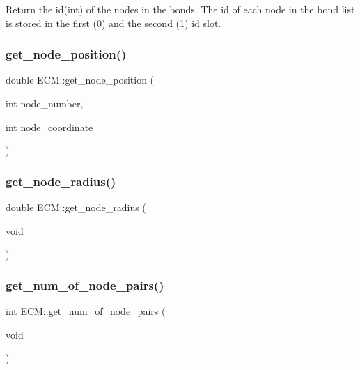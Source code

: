 Return the id(int) of the nodes in the bonds. The id of each node in the bond list is stored in the first (0) and the second (1) id slot. \mbox{\label{classECM_a7c17fccf4d4f8165a7dceee20c81433d}} 
\subsubsection{\texorpdfstring{get\_node\_position()}{get\_node\_position()}}
{\footnotesize\ttfamily double E\+C\+M\+::get\+\_\+node\+\_\+position (\begin{DoxyParamCaption}\item[{int}]{node\+\_\+number,  }\item[{int}]{node\+\_\+coordinate }\end{DoxyParamCaption})\hspace{0.3cm}{\ttfamily [inline]}}

\mbox{\label{classECM_a59c396242e1f2a7992bcb3744c27d280}} 
\subsubsection{\texorpdfstring{get\_node\_radius()}{get\_node\_radius()}}
{\footnotesize\ttfamily double E\+C\+M\+::get\+\_\+node\+\_\+radius (\begin{DoxyParamCaption}\item[{void}]{ }\end{DoxyParamCaption})\hspace{0.3cm}{\ttfamily [inline]}}

\mbox{\label{classECM_aadeaefad8e0e1ca296249ed4c8a5ade9}} 
\subsubsection{\texorpdfstring{get\_num\_of\_node\_pairs()}{get\_num\_of\_node\_pairs()}}
{\footnotesize\ttfamily int E\+C\+M\+::get\+\_\+num\+\_\+of\+\_\+node\+\_\+pairs (\begin{DoxyParamCaption}\item[{void}]{ }\end{DoxyParamCaption})\hspace{0.3cm}{\ttfamily [inline]}}

